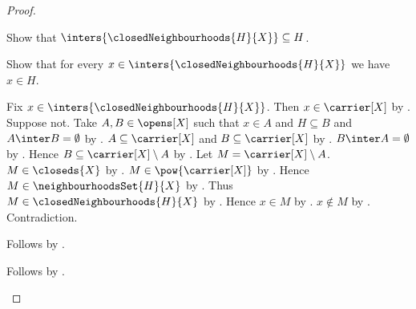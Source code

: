 \begin{proof}
\begin{subproof}
        Show that $\inters{\closedNeighbourhoods{H}{X}}\subseteq H$.
        \begin{subproof}
            Show that for every
                $x\in\inters{\closedNeighbourhoods{H}{X}}$ we have $x\in H$.
            \begin{subproof}
                Fix $x\in\inters{\closedNeighbourhoods{H}{X}}$.
                Then $x\in\carrier[X]$
                    by .
                Suppose not.
                Take $A,B\in\opens[X]$ such that $x\in A$ and $H\subseteq B$
                    and $A\inter B=\emptyset$ by .
                $A\subseteq\carrier[X]$ and $B\subseteq\carrier[X]$
                    by .
                $B\inter A=\emptyset$ by .
                Hence $B\subseteq\carrier[X]\setminus A$
                    by .
                Let $M=\carrier[X]\setminus A$.
                $M\in\closeds{X}$ by .
                $M\in\pow{\carrier[X]}$ by .
                Hence $M\in\neighbourhoodsSet{H}{X}$
                    by .
                Thus $M\in\closedNeighbourhoods{H}{X}$
                    by .
                Hence $x\in M$ by .
                $x\notin M$ by .
                Contradiction.
            \end{subproof}
            Follows by .
        \end{subproof}
        Follows by .
    \end{subproof}


\end{proof}
